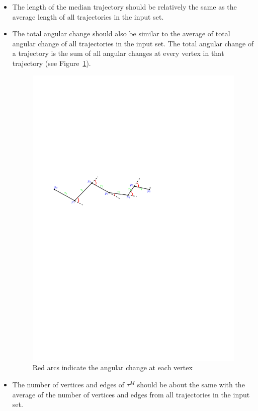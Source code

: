 \begin{itemize}
\item 
The length of the median trajectory should be relatively the same as the average length of all trajectories in the input set.

\item 
The total angular change should also be similar to the average of total angular change of all trajectories in the input set.
The total angular change of a trajectory is the sum of all angular changes at every vertex in that trajectory (see Figure~\ref{fig:total_ang}). 

\begin{figure}
\centering
\includegraphics[scale=1]{Gambar/total_ang}
\caption[Red arcs indicate the angular change at each vertex]{Red arcs indicate the angular change at each vertex} 
\label{fig:total_ang}
\end{figure}

\item 
The number of vertices and edges of $\tau^{M}$ should be about the same with the average of the number of vertices and edges from all trajectories in the input set.
\end{itemize}


